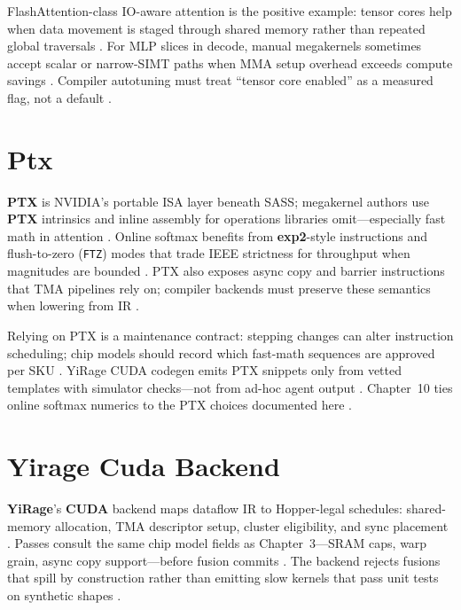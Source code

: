 FlashAttention-class IO-aware attention is the positive example: tensor cores help when data movement is staged through shared memory rather than repeated global traversals \citep{dao2022flashattention,patel2025llminference}.
For MLP slices in decode, manual megakernels sometimes accept scalar or narrow-SIMT paths when MMA setup overhead exceeds compute savings \citep{memoryfloor2026,semianalysis2024tma}.
Compiler autotuning must treat ``tensor core enabled'' as a measured flag, not a default \citep{patel2025llminference}.

\section{Ptx}
\label{sec:ptx}

\textbf{PTX} is NVIDIA's portable ISA layer beneath SASS; megakernel authors use \textbf{PTX} intrinsics and inline assembly for operations libraries omit---especially fast math in attention \citep{nvidia2022hopper,dlbook}.
Online softmax benefits from \textbf{exp2}-style instructions and flush-to-zero (\texttt{FTZ}) modes that trade IEEE strictness for throughput when magnitudes are bounded \citep{dao2022flashattention,patel2025llminference}.
PTX also exposes async copy and barrier instructions that TMA pipelines rely on; compiler backends must preserve these semantics when lowering from IR \citep{nvidia2022hopper,semianalysis2024tma}.

Relying on PTX is a maintenance contract: stepping changes can alter instruction scheduling; chip models should record which fast-math sequences are approved per SKU \citep{semianalysis2024tma,memoryfloor2026}.
YiRage CUDA codegen emits PTX snippets only from vetted templates with simulator checks---not from ad-hoc agent output \citep{patel2025llminference}.
Chapter~10 ties online softmax numerics to the PTX choices documented here \citep{dao2022flashattention}.

\section{Yirage Cuda Backend}
\label{sec:yirage_cuda_backend}

\textbf{YiRage}'s \textbf{CUDA} backend maps dataflow IR to Hopper-legal schedules: shared-memory allocation, TMA descriptor setup, cluster eligibility, and sync placement \citep{patel2025llminference,nvidia2022hopper}.
Passes consult the same chip model fields as Chapter~3---SRAM caps, warp grain, async copy support---before fusion commits \citep{memoryfloor2026,semianalysis2024tma}.
The backend rejects fusions that spill by construction rather than emitting slow kernels that pass unit tests on synthetic shapes \citep{patel2025llminference,taxbreak2026}.

